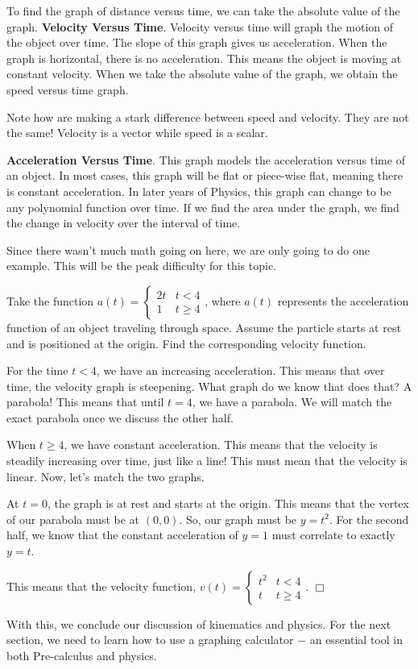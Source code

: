 \documentclass[../book.tex]{subfiles}
\begin{document}
To find the graph of distance versus time, we can take the absolute value of the graph.
\textbf{Velocity Versus Time}.  Velocity versus time will graph the motion of the object over time.  The slope of this graph gives us acceleration.  When the graph is horizontal, there is no acceleration.  This means the object is moving at constant velocity.  When we take the absolute value of the graph, we obtain the speed versus time graph.

\begin{remark}
Note how are making a stark difference between speed and velocity.  They are not the same!  Velocity is a vector while speed is a scalar.
\end{remark}

\textbf{Acceleration Versus Time}.  This graph models the acceleration versus time of an object.  In most cases, this graph will be flat or piece-wise flat, meaning there is constant acceleration.  In later years of Physics, this graph can change to be any polynomial function over time.  If we find the area under the graph, we find the change in velocity over the interval of time.

Since there wasn't much math going on here, we are only going to do one example.  This will be the peak difficulty for this topic.
\begin{example}
Take the function $a(t)=\begin{cases} 2t & t<4 \\ 1 & t\geq 4 \end{cases}$, where $a(t)$ represents the acceleration function of an object traveling through space.  Assume the particle starts at rest and is positioned at the origin.  Find the corresponding velocity function.
\end{example}
\begin{solution}
For the time $t<4$, we have an increasing acceleration.  This means that over time, the velocity graph is steepening.  What graph do we know that does that? A parabola!  This means that until $t=4$, we have a parabola.  We will match the exact parabola once we discuss the other half.

When $t\geq 4$, we have constant acceleration.  This means that the velocity is steadily increasing over time, just like a line!  This must mean that the velocity is linear.  Now, let's match the two graphs.

At $t=0$, the graph is at rest and starts at the origin.  This means that the vertex of our parabola must be at $(0,0)$.  So, our graph must be $y=t^2$.  For the second half, we know that the constant acceleration of $y=1$ must correlate to exactly $y=t$.

This means that the velocity function, $v(t)=\begin{cases} t^2 & t<4 \\ t & t\geq 4\end{cases}$. $\Box$
\end{solution}
With this, we conclude our discussion of kinematics and physics.  For the next section, we need to learn how to use a graphing calculator $-$ an essential tool in both Pre-calculus and physics.
\end{document}
